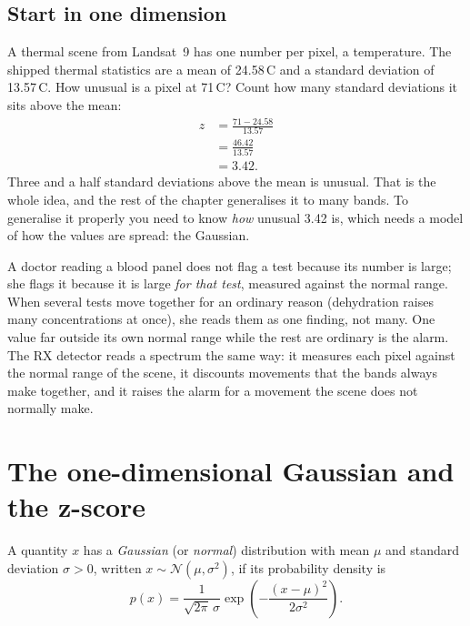 \subsection{Start in one dimension}

A thermal scene from Landsat~9 has one number per pixel, a temperature. The shipped thermal
statistics are a mean of 24.58\,\textdegree C and a
standard deviation of 13.57\,\textdegree C. How unusual
is a pixel at 71\,\textdegree C? Count how many standard deviations it sits above the mean:
\begin{align*}
z &= \frac{71 - 24.58}{13.57}\\
  &= \frac{46.42}{13.57}\\
  &= 3.42 .
\end{align*}
Three and a half standard deviations above the mean is unusual. That is the whole idea, and the
rest of the chapter generalises it to many bands. To generalise it properly you need to know
\emph{how} unusual 3.42 is, which needs a model of how the values are spread: the Gaussian.

\begin{analogy}
A doctor reading a blood panel does not flag a test because its number is large; she flags it
because it is large \emph{for that test}, measured against the normal range. When several tests move
together for an ordinary reason (dehydration raises many concentrations at once), she reads them as
one finding, not many. One value far outside its own normal range while the rest are ordinary is the
alarm. The RX detector reads a spectrum the same way: it measures each pixel against the normal
range of the scene, it discounts movements that the bands always make together, and it raises the
alarm for a movement the scene does not normally make.
\end{analogy}

\section{The one-dimensional Gaussian and the z-score}\label{sec:rx:gauss1d}

\begin{definition}
A quantity $x$ has a \emph{Gaussian} (or \emph{normal}) distribution with mean $\mu$ and standard
deviation $\sigma > 0$, written $x \sim \mathcal{N}(\mu, \sigma^2)$, if its probability density is
\begin{equation}\label{eq:rx:gauss1d}
p(x) = \frac{1}{\sqrt{2\pi}\,\sigma}\exp\!\left(-\frac{(x - \mu)^2}{2\sigma^2}\right).
\end{equation}
\end{definition}

